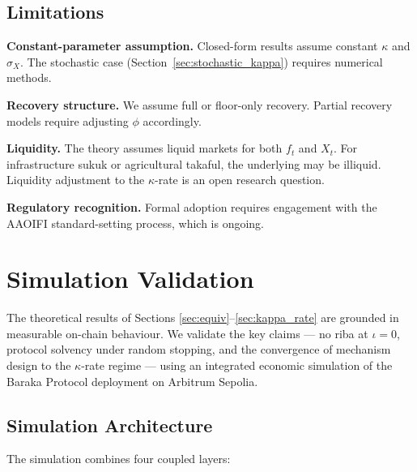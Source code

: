 \documentclass[10pt,twocolumn]{article}
\theoremstyle{plain}
\theoremstyle{definition}
\begin{document}
\subsection{Limitations}

\textbf{Constant-parameter assumption.} Closed-form results assume
constant $\kappa$ and $\sigma_X$. The stochastic case
(Section~\ref{sec:stochastic_kappa}) requires numerical methods.

\textbf{Recovery structure.} We assume full or floor-only recovery.
Partial recovery models require adjusting $\phi$ accordingly.

\textbf{Liquidity.} The theory assumes liquid markets for both
$f_t$ and $X_t$. For infrastructure sukuk or agricultural takaful,
the underlying may be illiquid. Liquidity adjustment to the
$\kappa$-rate is an open research question.

\textbf{Regulatory recognition.} Formal adoption requires
engagement with the AAOIFI standard-setting process, which is ongoing.

\section{Simulation Validation}
\label{sec:simulation}

\noindent The theoretical results of Sections
\ref{sec:equiv}--\ref{sec:kappa_rate} are grounded in
measurable on-chain behaviour. We validate the key claims ---
no riba at $\iota=0$, protocol solvency under random stopping,
and the convergence of mechanism design to the $\kappa$-rate
regime --- using an integrated economic simulation of the
Baraka Protocol deployment on Arbitrum Sepolia.

\subsection{Simulation Architecture}

The simulation combines four coupled layers:
\end{document}
